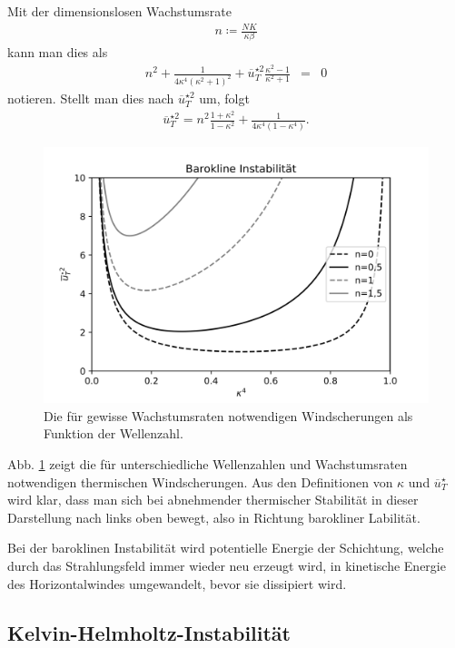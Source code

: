 \documentclass{book}
\newcommand\newoverline[1]{%
\overline{#1}}
\begin{document}
%
Mit der dimensionslosen Wachstumsrate
%
\begin{eqnarray}
n \coloneqq\frac{NK}{\kappa\beta}
\end{eqnarray}
%
kann man dies als
%
\begin{eqnarray}
n^2 + \frac{1}{4\kappa^4\left(\kappa^2 + 1\right)^2} + \newoverline{u}^{\star2}_T\frac{\kappa^2 - 1}{\kappa^2 + 1} & = & 0
\end{eqnarray}
%
notieren. Stellt man dies nach $\newoverline{u}^{\star2}_T$ um, folgt
%
\begin{eqnarray}
\newoverline{u}^{\star2}_T = n^2\frac{1 + \kappa^2}{1 - \kappa^2} + \frac{1}{4\kappa^4\left(1 - \kappa^4\right)}.
\end{eqnarray}
%
\begin{figure}
\centering
\includegraphics[width = .65\textwidth]{figs/baro_inst.png}
\caption{Die für gewisse Wachstumsraten notwendigen Windscherungen als Funktion der Wellenzahl.}
\label{fig:barokline_instabilitaet}
\end{figure}

Abb. \ref{fig:barokline_instabilitaet} zeigt die für unterschiedliche Wellenzahlen und Wachstumsraten notwendigen thermischen Windscherungen. Aus den Definitionen von $\kappa$ und $\newoverline{u}^\star_T$ wird klar, dass man sich bei abnehmender thermischer Stabilität in dieser Darstellung nach links oben bewegt, also in Richtung barokliner Labilität.

Bei der baroklinen Instabilität wird potentielle Energie der Schichtung, welche durch das Strahlungsfeld immer wieder neu erzeugt wird, in kinetische Energie des Horizontalwindes umgewandelt, bevor sie dissipiert wird.

\subsection{Kelvin-Helmholtz-Instabilität}
\label{sec:kelvin-helmholtz-instabilitaet}
\end{document}
